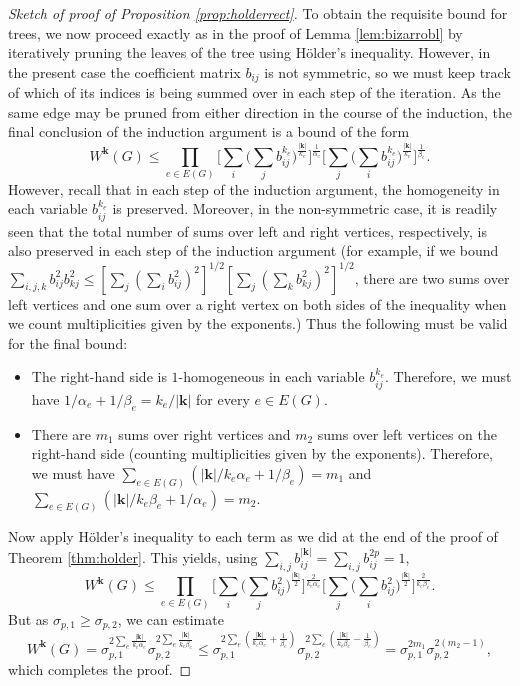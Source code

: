 \documentclass[10pt,reqno]{amsart}
\theoremstyle{definition}
\numberwithin{equation}{section}
\numberwithin{figure}{section}
\numberwithin{table}{section}
\begin{document}
\begin{proof}[Sketch of proof of Proposition \ref{prop:holderrect}]
To obtain the requisite bound for trees, we now proceed exactly as in the 
proof of Lemma \ref{lem:bizarrobl} by iteratively pruning the leaves of 
the tree using H\"older's inequality. However, in the present case the 
coefficient matrix $b_{ij}$ is not symmetric, so we must keep track of 
which of its indices is being summed over in each step of the iteration. 
As the same edge may be pruned from either direction in the course of the 
induction, the final conclusion of the induction argument is a bound of 
the form
$$
	W^{\mathbf{k}}(G) \le
	\prod_{e\in E(G)}
	\Bigg[\sum_i\Bigg(\sum_j b_{ij}^{k_e}\Bigg)^{\frac{|\mathbf{k}|}{k_e}}
	\Bigg]^{\frac{1}{\alpha_e}}
	\Bigg[\sum_j\Bigg(\sum_i b_{ij}^{k_e}\Bigg)^{\frac{|\mathbf{k}|}{k_e}}
	\Bigg]^{\frac{1}{\beta_e}}.
$$
However, recall that in each step of the induction argument, the 
homogeneity in each variable $b_{ij}^{k_e}$ is preserved. Moreover, 
in the non-symmetric case, it is readily seen that the total number of 
sums over left and right vertices, respectively, is also preserved in each 
step of the induction argument (for example, if we bound
$\sum_{i,j,k}b_{ij}^2b_{kj}^2\le
[\sum_j(\sum_ib_{ij}^2)^2]^{1/2}
[\sum_j(\sum_k b_{kj}^2)^2]^{1/2}$, there are two sums over left vertices
and one sum over a right vertex on both sides of the inequality when we
count multiplicities given by the exponents.)
Thus the following must be valid for the final bound:
\begin{itemize}[label=\textbullet, leftmargin=*]
\item The right-hand side is $1$-homogeneous in each variable
$b_{ij}^{k_e}$. Therefore, we must have $1/\alpha_e+1/\beta_e = 
k_e/|\mathbf{k}|$ for every $e\in E(G)$.
\item There are $m_1$ sums over right vertices and $m_2$ sums over left 
vertices on the right-hand side (counting multiplicities given by the 
exponents). Therefore, we must have $\sum_{e\in E(G)} 
(|\mathbf{k}|/k_e\alpha_e+1/\beta_e) = m_1$ and
$\sum_{e\in E(G)} (|\mathbf{k}|/k_e\beta_e+1/\alpha_e) = m_2$.
\end{itemize}
Now apply H\"older's inequality to each term as we did at the end of the 
proof of Theorem \ref{thm:holder}. This yields, using
$\sum_{i,j}b_{ij}^{|\mathbf{k}|}=\sum_{i,j}b_{ij}^{2p}=1$,
$$
	W^{\mathbf{k}}(G) \le
	\prod_{e\in E(G)}
	\Bigg[
	\sum_i\Bigg(\sum_j b_{ij}^2\Bigg)^{\frac{|\mathbf{k}|}{2}}
	\Bigg]^{\frac{2}{k_e\alpha_e}}
	\Bigg[\sum_j\Bigg(\sum_i b_{ij}^2\Bigg)^{\frac{|\mathbf{k}|}{2}}
	\Bigg]^{\frac{2}{k_e\beta_e}}.
$$
But as $\sigma_{p,1}\ge\sigma_{p,2}$, we can estimate
$$
	W^{\mathbf{k}}(G) 
	=
	\sigma_{p,1}^{2\sum_e \frac{|\mathbf{k}|}{k_e\alpha_e}}
	\sigma_{p,2}^{2\sum_e \frac{|\mathbf{k}|}{k_e\beta_e}}
	\le
	\sigma_{p,1}^{2\sum_e(\frac{|\mathbf{k}|}{k_e\alpha_e}+\frac{1}{\beta_e})}
	\sigma_{p,2}^{2\sum_e(\frac{|\mathbf{k}|}{k_e\beta_e}-\frac{1}{\beta_e})}
	=
	\sigma_{p,1}^{2m_1}
	\sigma_{p,2}^{2(m_2-1)},
$$
which completes the proof.
\end{proof}
\end{document}
